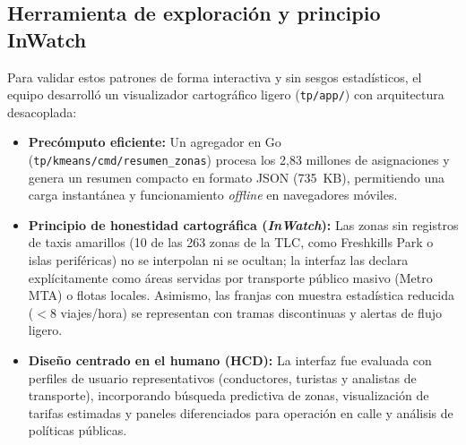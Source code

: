\subsection{Herramienta de exploración y principio InWatch}

Para validar estos patrones de forma interactiva y sin sesgos estadísticos, el equipo desarrolló
un visualizador cartográfico ligero (\texttt{tp/app/}) con arquitectura desacoplada:
\begin{itemize}
  \item \textbf{Precómputo eficiente:} Un agregador en Go (\texttt{tp/kmeans/cmd/resumen\_zonas})
        procesa los 2{,}83 millones de asignaciones y genera un resumen compacto en formato JSON
        (735~KB), permitiendo una carga instantánea y funcionamiento \emph{offline} en navegadores
        móviles.
  \item \textbf{Principio de honestidad cartográfica (\emph{InWatch}):} Las zonas sin registros de
        taxis amarillos (10 de las 263 zonas de la TLC, como Freshkills Park o islas periféricas) no
        se interpolan ni se ocultan; la interfaz las declara explícitamente como áreas servidas por
        transporte público masivo (Metro MTA) o flotas locales. Asimismo, las franjas con muestra
        estadística reducida ($< 8$ viajes/hora) se representan con tramas discontinuas y alertas de
        flujo ligero.
  \item \textbf{Diseño centrado en el humano (HCD):} La interfaz fue evaluada con perfiles de
        usuario representativos (conductores, turistas y analistas de transporte), incorporando
        búsqueda predictiva de zonas, visualización de tarifas estimadas y paneles diferenciados
        para operación en calle y análisis de políticas públicas.
\end{itemize}

